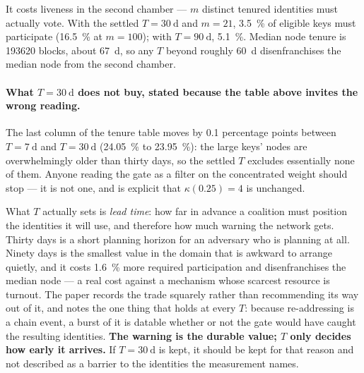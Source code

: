 It costs liveness in the second chamber — $m$ distinct tenured identities must actually vote. With
the settled $T = \SI{30}{\day}$ and $m = 21$, \SI{3.5}{\percent} of eligible keys must participate
(\SI{16.5}{\percent} at $m = 100$); with $T = \SI{90}{\day}$, \SI{5.1}{\percent}. Median node
tenure is \num{193620} blocks, about
\SI{67}{\day}, so any $T$ beyond roughly \SI{60}{\day} disenfranchises the median node from the
second chamber.

\paragraph{What $T = \SI{30}{\day}$ does not buy, stated because the table above invites the wrong
reading.} The last column of the tenure table moves by \num{0.1} percentage points between
$T = \SI{7}{\day}$ and $T = \SI{30}{\day}$ (\SI{24.05}{\percent} to \SI{23.95}{\percent}): the large
keys' nodes are overwhelmingly older than thirty days, so the settled $T$ excludes essentially none
of them. Anyone reading the gate as a filter on the concentrated weight should stop --- it is not
one, and  is explicit that $\kappa(0.25) = 4$ is unchanged.

What $T$ actually sets is \emph{lead time}: how far in advance a coalition must position the
identities it will use, and therefore how much warning the network gets. Thirty days is a short
planning horizon for an adversary who is planning at all. Ninety days is the smallest value in the
domain that is awkward to arrange quietly, and it costs \SI{1.6}{\percent} more required
participation and disenfranchises the median node --- a real cost against a mechanism whose scarcest
resource is turnout. The paper records the trade squarely rather than recommending its way out of it,
and notes the one thing that holds at every $T$: because re-addressing is a chain event, a burst of it
is datable whether or not the gate would have caught the resulting identities. \textbf{The warning is
the durable value; $T$ only decides how early it arrives.} If $T = \SI{30}{\day}$ is kept, it should
be kept for that reason and not described as a barrier to the identities the measurement names.


